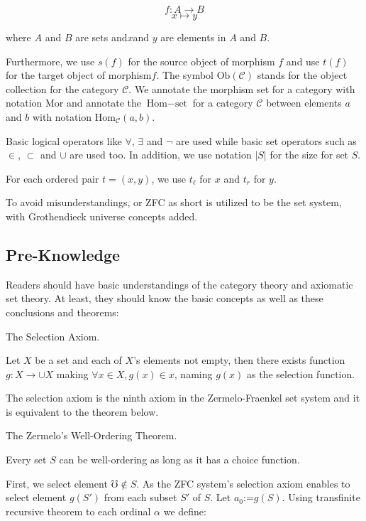 \documentclass{article}
\begin{document}
\[f: A\to B\]
\[x\mapsto y\]

where \(A\) and \(B\) are sets and\(x\)and \(y\) are elements in \(A\) and \(B\).

 Furthermore, we use \(s(f)\) for the source object of morphism \(f\)\textit{  }and use \(t(f)\) for the target object of morphism\(f\). The symbol \(\text{Ob}(\mathcal{C})\) stands for the object collection for the category \(\mathcal{C}\). We annotate the morphism set for a category with notation \(\text{Mor}\) and annotate the \(\text{Hom}-\text{set}\) for a category \(\mathcal{C}\) between elements \(a\) and \(b\) with notation \(\text{Hom}_{\mathcal{C}}(a,b)\).

Basic logical operators like \(\forall\), \(\exists\) and \(\neg\) are used while basic set operators such as \(\in\), \(\subset\) and \(\cup\) are used too. In addition, we use notation \(|S|\) for the size for set \(S\).

For each ordered pair \(t=(x,y)\), we use \(t_{\ell }\) for \(x\) and \(t_{\mathit{r}}\) for \(y\).

To avoid misunderstandings,  or ZFC as short is utilized to be the set system, with Grothendieck universe concepts added. \cite{1}

\subsection*{Pre-Knowledge}

Readers should have basic understandings of the category theory \cite{1} and axiomatic set theory. At least, they should know the basic concepts as well as these conclusions and theorems:

 The Selection Axiom.

Let \(X\) be a set and each of \(X\){'}s elements not empty, then there exists function \(g:X\to \cup X\) making \(\forall x\in X,g(x)\in x\), naming \(g(x)\) as the selection function.

The selection axiom is the ninth axiom in the Zermelo-Fraenkel set system and it is equivalent to the theorem below.

The Zermelo{'}s Well-Ordering Theorem.\cite{1}

Every set \(S\) can be well-ordering as long as it has a choice function.

 First, we select element \(\mho \notin S\). As the ZFC system{'}s selection axiom enables to select element \(g(S')\) from each subset \(S'\) of \(S\). Let \(a_0\text{:=}g(S)\). Using transfinite recursive theorem to each ordinal \(\alpha\) we define:
\end{document}
